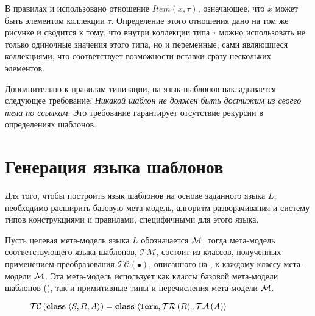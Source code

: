 {{В правилах  и  использовано отношение $Item(x,\tau)$, означающее, что $x$ может быть элементом коллекции $\tau$. Определение этого отношения дано на том же рисунке и сводится к тому, что внутри коллекции типа $\tau$ можно использовать не только одиночные значения этого типа, но и переменные, сами являющиеся коллекциями, что соответствует возможности вставки сразу нескольких элементов.


Дополнительно к правилам типизации, на язык шаблонов накладывается следующее требование: 
\emph{Никакой шаблон не должен быть достижим из своего тела по ссылкам}. Это требование гарантирует отсутствие рекурсии в определениях шаблонов.

\section{Генерация языка шаблонов}

\newcommand{\TM}{\mathcal{TM}}
\newcommand{\TC}[1]{\mathcal{TC}\left(#1\right)}
\newcommand{\TR}[1]{\mathcal{TR}\left(#1\right)}
\newcommand{\TA}[1]{\mathcal{TA}\left(#1\right)}

Для того, чтобы построить язык шаблонов на основе заданного языка $L$, необходимо расширить базовую мета-модель, алгоритм разворачивания и систему типов конструкциями и правилами, специфичными для этого языка. 

Пусть целевая мета-модель языка $L$ обозначается $\mathcal{M}$, тогда мета-модель соответствующего языка шаблонов, $\TM$, состоит из классов, полученных применением преобразования $\TC{\bullet}$, описанного на , к каждому классу мета-модели $\mathcal{M}$. Эта мета-модель использует как классы базовой мета-модели шаблонов (), так и примитивные типы и перечисления мета-модели $\mathcal{M}$.

\begin{figure}[htbp]
	\centering
$\TC{\class{}{S}{R}{A}} = \class{}
			{\mathtt{Term}}{\TR{R}}{\TA{A}}$
			

\end{figure}}}
